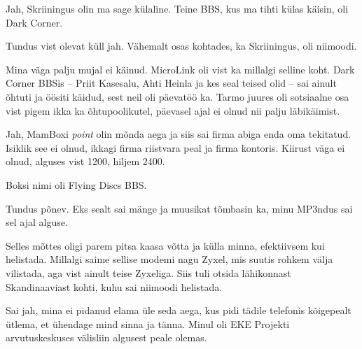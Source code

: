 Jah, Skriiningus olin ma sage külaline. Teine BBS, kus ma tihti 
külas käisin, oli Dark Corner.


Tundus vist olevat küll jah. Vähemalt osas kohtades, ka Skriiningus, oli 
niimoodi.


Mina väga palju mujal ei käinud. MicroLink oli vist ka millalgi selline koht. 
Dark Corner BBSis -- Priit Kasesalu, Ahti 
Heinla ja kes seal teised olid -- sai 
ainult õhtuti ja öösiti käidud, sest neil oli päevatöö ka.
Tarmo juures oli sotsiaalne osa vist pigem ikka ka
õhtupoolikutel, päevasel ajal ei olnud nii palju 
läbikäimist.


Jah, MamBoxi \emph{point} olin mõnda aega ja siis sai 
firma abiga enda oma tekitatud. Isiklik see ei olnud, ikkagi firma 
riistvara peal ja firma kontoris. Kiirust väga ei olnud, alguses vist 
1200, hiljem 2400. 


Boksi nimi oli Flying Discs BBS. 


Tundus põnev. Eks sealt sai mänge ja muusikat tõmbasin ka, minu MP3ndus 
sai sel ajal alguse.


Selles mõttes oligi parem pitsa kaasa võtta ja külla minna, efektiivsem kui helistada. Millalgi saime sellise modemi nagu 
Zyxel, mis suutis rohkem välja vilistada, aga vist 
ainult teise Zyxeliga. Siis tuli otsida lähikonnast Skandinaaviast 
kohti, kuhu sai niimoodi helistada.


Sai jah, mina ei pidanud elama üle seda aega, kus pidi tädile 
telefonis kõigepealt ütlema, et ühendage mind sinna ja tänna. Minul oli EKE 
Projekti arvutuskeskuses välisliin algusest peale olemas. 

